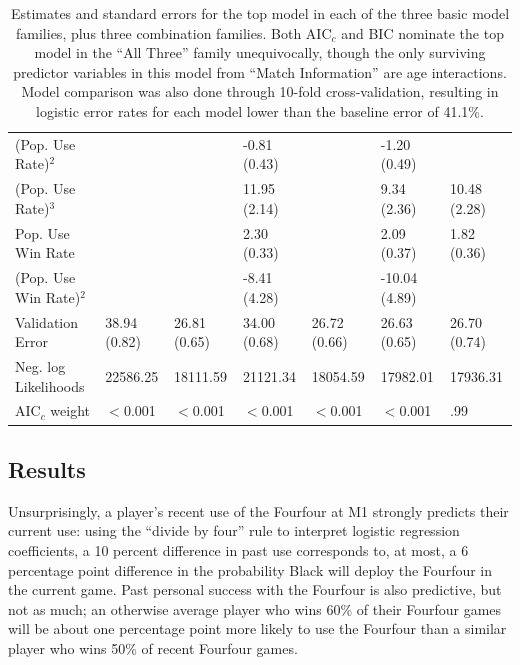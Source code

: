 \begin{table}
\begin{footnotesize}
\begin{tabular}{lllllll}
    (Pop. Use Rate)$^2$ &       &       & -0.81 (0.43) &       & -1.20 (0.49) &  \\
    (Pop. Use Rate)$^3$ &       &       & 11.95 (2.14) &       & 9.34 (2.36) & 10.48 (2.28) \\
    Pop. Use Win Rate &       &       & 2.30 (0.33) &       & 2.09 (0.37) & 1.82 (0.36) \\
    (Pop. Use Win Rate)$^2$ &       &       & -8.41 (4.28) &       & -10.04 (4.89) &  \\
    \hline
    Validation Error & 38.94 (0.82)  & 26.81 (0.65)  & 34.00 (0.68) & 26.72 (0.66) & 26.63 (0.65) & 26.70 (0.74) \\
    Neg. log Likelihoods & 22586.25 & 18111.59 & 21121.34 & 18054.59 & 17982.01 & 17936.31 \\
    AIC$_c$ weight & $<$0.001  & $<$0.001     & $<$0.001     & $<$0.001     & $<$0.001     &  .99 \\
    \hline
    \end{tabular}%
	\caption{Estimates and standard errors for the top model in each of the three basic model families, plus three combination families.  Both AIC$_c$ and BIC nominate the top model in the ``All Three'' family unequivocally, though the only surviving predictor variables in this model from ``Match Information'' are age interactions.  Model comparison was also done through 10-fold cross-validation, resulting in logistic error rates for each model lower than the baseline error of 41.1\%.}
	\label{tab:Coeftab}%
    \end{footnotesize}
\end{table}%


\subsection{Results}

Unsurprisingly, a player's recent use of the Fourfour at M1 strongly predicts their current use: using the ``divide by four'' rule to interpret logistic regression coefficients, a 10 percent difference in past use corresponds to, at most, a 6 percentage point difference in the probability Black will deploy the Fourfour in the current game.  Past personal success with the Fourfour is also predictive, but not as much; an otherwise average player who wins 60\% of their Fourfour games will be about one percentage point more likely to use the Fourfour than a similar player who wins 50\% of recent Fourfour games.  


